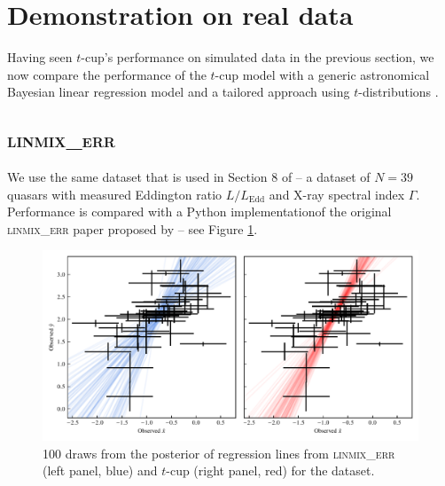 \documentclass[fleqn,usenatbib]{rasti}
\begin{document}
\section{Demonstration on real data}
\label{sec:real-world}

Having seen $t$-cup's performance on simulated data in the previous section, we
now compare the performance of the $t$-cup model with a generic astronomical
Bayesian linear regression model \citep[\textsc{linmix\_err};][]{Kelly:2007} and
a tailored approach using $t$-distributions \citep{Park:2017}.

\subsection{\textsc{linmix\_err}}

We use the same dataset that is used in Section 8 of \citet{Kelly:2007} -- a
dataset of $N = 39$ quasars with measured Eddington ratio $L / L_{\text{Edd}}$
and X-ray spectral index $\Gamma$. Performance is compared with a Python
implementation\footnotemark of the original \textsc{linmix\_err} paper proposed
by \citeauthor{Kelly:2007} -- see Figure \ref{fig:real-world.kelly.regression}.


\begin{figure}
    \includegraphics[width=\linewidth]{graphics/real/regression_kelly.pdf}
    \caption{100 draws from the posterior of regression lines from
    \textsc{linmix\_err} (left panel, blue) and $t$-cup (right panel, red) for
    the \citet{Kelly:2007} dataset.}
    \label{fig:real-world.kelly.regression}
\end{figure}
\end{document}
